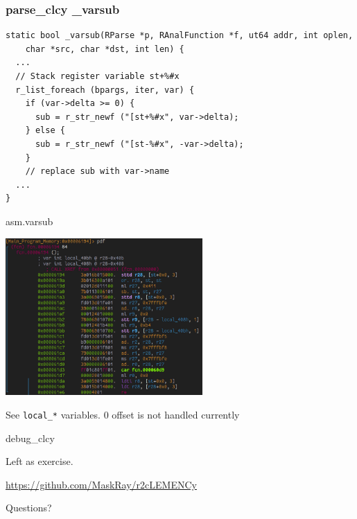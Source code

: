 \documentclass{beamer}
\begin{document}
\begin{frame}[fragile]
  \frametitle{parse\_clcy \_varsub}
  \scriptsize
  \begin{verbatim}
static bool _varsub(RParse *p, RAnalFunction *f, ut64 addr, int oplen,
    char *src, char *dst, int len) {
  ...
  // Stack register variable st+%#x
  r_list_foreach (bpargs, iter, var) {
    if (var->delta >= 0) {
      sub = r_str_newf ("[st+%#x", var->delta);
    } else {
      sub = r_str_newf ("[st-%#x", -var->delta);
    }
    // replace sub with var->name
  ...
}
  \end{verbatim}
\end{frame}

\begin{frame}{asm.varsub}
  \begin{center}
    \includegraphics[height=6cm]{varsub.jpg}
  \end{center}
  \begin{center}
    \large See \texttt{local\_*} variables. 0 offset is not handled currently
  \end{center}
\end{frame}

\begin{frame}{debug\_clcy}
  \begin{center}
    \Large Left as exercise.
  \end{center}
\end{frame}

\begin{frame}
  \begin{center}
    \Large \url{https://github.com/MaskRay/r2cLEMENCy}
  \end{center}
  \begin{center}
    \Large Questions?
  \end{center}
\end{frame}
\end{document}
